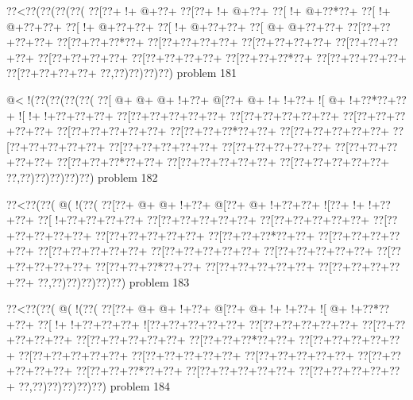 \vbox{\vbox{\goo
\0??<\0??(\0??(\0??(\0??(
\0??[\0??+\- !+\- @+\0??+
\0??[\0??+\- !+\- @+\0??+
\0??[\- !+\- @+\0??*\0??+
\0??[\- !+\- @+\0??+\0??+
\0??[\- !+\- @+\0??+\0??+
\0??[\- !+\- @+\0??+\0??+
\0??[\- @+\- @+\0??+\0??+
\0??[\0??+\0??+\0??+\0??+
\0??[\0??+\0??+\0??*\0??+
\0??[\0??+\0??+\0??+\0??+
\0??[\0??+\0??+\0??+\0??+
\0??[\0??+\0??+\0??+\0??+
\0??[\0??+\0??+\0??+\0??+
\0??[\0??+\0??+\0??+\0??+
\0??[\0??+\0??+\0??*\0??+
\0??[\0??+\0??+\0??+\0??+
\0??[\0??+\0??+\0??+\0??+
\0??,\0??)\0??)\0??)\0??)
}
\hfil problem 181\hfil\break
}

\vbox{\vbox{\goo
\- @<\- !(\0??(\0??(\0??(\0??(
\0??[\- @+\- @+\- @+\- !+\0??+
\- @[\0??+\- @+\- !+\- !+\0??+
\- ![\- @+\- !+\0??*\0??+\0??+
\- ![\- !+\- !+\0??+\0??+\0??+
\0??[\0??+\0??+\0??+\0??+\0??+
\0??[\0??+\0??+\0??+\0??+\0??+
\0??[\0??+\0??+\0??+\0??+\0??+
\0??[\0??+\0??+\0??+\0??+\0??+
\0??[\0??+\0??+\0??*\0??+\0??+
\0??[\0??+\0??+\0??+\0??+\0??+
\0??[\0??+\0??+\0??+\0??+\0??+
\0??[\0??+\0??+\0??+\0??+\0??+
\0??[\0??+\0??+\0??+\0??+\0??+
\0??[\0??+\0??+\0??+\0??+\0??+
\0??[\0??+\0??+\0??*\0??+\0??+
\0??[\0??+\0??+\0??+\0??+\0??+
\0??[\0??+\0??+\0??+\0??+\0??+
\0??,\0??)\0??)\0??)\0??)\0??)
}
\hfil problem 182\hfil\break
}

\vbox{\vbox{\goo
\0??<\0??(\0??(\- @(\- !(\0??(
\0??[\0??+\- @+\- @+\- !+\0??+
\- @[\0??+\- @+\- !+\0??+\0??+
\- ![\0??+\- !+\- !+\0??+\0??+
\0??[\- !+\0??+\0??+\0??+\0??+
\0??[\0??+\0??+\0??+\0??+\0??+
\0??[\0??+\0??+\0??+\0??+\0??+
\0??[\0??+\0??+\0??+\0??+\0??+
\0??[\0??+\0??+\0??+\0??+\0??+
\0??[\0??+\0??+\0??*\0??+\0??+
\0??[\0??+\0??+\0??+\0??+\0??+
\0??[\0??+\0??+\0??+\0??+\0??+
\0??[\0??+\0??+\0??+\0??+\0??+
\0??[\0??+\0??+\0??+\0??+\0??+
\0??[\0??+\0??+\0??+\0??+\0??+
\0??[\0??+\0??+\0??*\0??+\0??+
\0??[\0??+\0??+\0??+\0??+\0??+
\0??[\0??+\0??+\0??+\0??+\0??+
\0??,\0??)\0??)\0??)\0??)\0??)
}
\hfil problem 183\hfil\break
}

\vbox{\vbox{\goo
\0??<\0??(\0??(\- @(\- !(\0??(
\0??[\0??+\- @+\- @+\- !+\0??+
\- @[\0??+\- @+\- !+\- !+\0??+
\- ![\- @+\- !+\0??*\0??+\0??+
\0??[\- !+\- !+\0??+\0??+\0??+
\- ![\0??+\0??+\0??+\0??+\0??+
\0??[\0??+\0??+\0??+\0??+\0??+
\0??[\0??+\0??+\0??+\0??+\0??+
\0??[\0??+\0??+\0??+\0??+\0??+
\0??[\0??+\0??+\0??*\0??+\0??+
\0??[\0??+\0??+\0??+\0??+\0??+
\0??[\0??+\0??+\0??+\0??+\0??+
\0??[\0??+\0??+\0??+\0??+\0??+
\0??[\0??+\0??+\0??+\0??+\0??+
\0??[\0??+\0??+\0??+\0??+\0??+
\0??[\0??+\0??+\0??*\0??+\0??+
\0??[\0??+\0??+\0??+\0??+\0??+
\0??[\0??+\0??+\0??+\0??+\0??+
\0??,\0??)\0??)\0??)\0??)\0??)
}
\hfil problem 184\hfil\break
}

